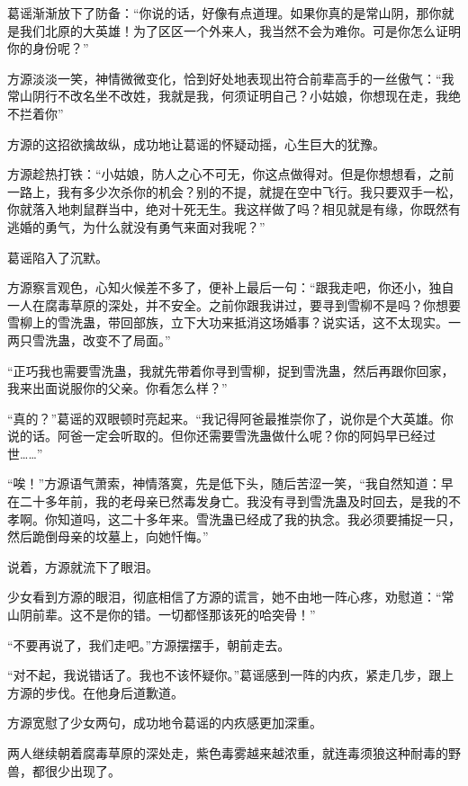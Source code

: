 
\begin{this_body}



葛谣渐渐放下了防备：“你说的话，好像有点道理。如果你真的是常山阴，那你就是我们北原的大英雄！为了区区一个外来人，我当然不会为难你。可是你怎么证明你的身份呢？”

方源淡淡一笑，神情微微变化，恰到好处地表现出符合前辈高手的一丝傲气：“我常山阴行不改名坐不改姓，我就是我，何须证明自己？小姑娘，你想现在走，我绝不拦着你”

方源的这招欲擒故纵，成功地让葛谣的怀疑动摇，心生巨大的犹豫。

方源趁热打铁：“小姑娘，防人之心不可无，你这点做得对。但是你想想看，之前一路上，我有多少次杀你的机会？别的不提，就提在空中飞行。我只要双手一松，你就落入地刺鼠群当中，绝对十死无生。我这样做了吗？相见就是有缘，你既然有逃婚的勇气，为什么就没有勇气来面对我呢？”

葛谣陷入了沉默。

方源察言观色，心知火候差不多了，便补上最后一句：“跟我走吧，你还小，独自一人在腐毒草原的深处，并不安全。之前你跟我讲过，要寻到雪柳不是吗？你想要雪柳上的雪洗蛊，带回部族，立下大功来抵消这场婚事？说实话，这不太现实。一两只雪洗蛊，改变不了局面。”

“正巧我也需要雪洗蛊，我就先带着你寻到雪柳，捉到雪洗蛊，然后再跟你回家，我来出面说服你的父亲。你看怎么样？”

“真的？”葛谣的双眼顿时亮起来。“我记得阿爸最推崇你了，说你是个大英雄。你说的话。阿爸一定会听取的。但你还需要雪洗蛊做什么呢？你的阿妈早已经过世……”

“唉！”方源语气萧索，神情落寞，先是低下头，随后苦涩一笑，“我自然知道：早在二十多年前，我的老母亲已然毒发身亡。我没有寻到雪洗蛊及时回去，是我的不孝啊。你知道吗，这二十多年来。雪洗蛊已经成了我的执念。我必须要捕捉一只，然后跪倒母亲的坟墓上，向她忏悔。”

说着，方源就流下了眼泪。

少女看到方源的眼泪，彻底相信了方源的谎言，她不由地一阵心疼，劝慰道：“常山阴前辈。这不是你的错。一切都怪那该死的哈突骨！”

“不要再说了，我们走吧。”方源摆摆手，朝前走去。

“对不起，我说错话了。我也不该怀疑你。”葛谣感到一阵的内疚，紧走几步，跟上方源的步伐。在他身后道歉道。

方源宽慰了少女两句，成功地令葛谣的内疚感更加深重。

两人继续朝着腐毒草原的深处走，紫色毒雾越来越浓重，就连毒须狼这种耐毒的野兽，都很少出现了。


\end{this_body}
